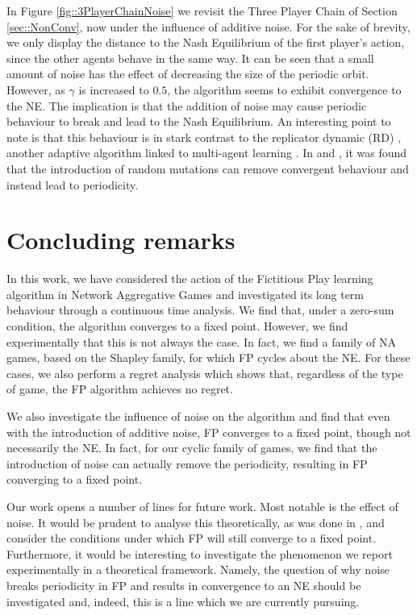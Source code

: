\documentclass{article}
\theoremstyle{definition}
\begin{document}
  In Figure \ref{fig::3PlayerChainNoise} we revisit the Three Player Chain of Section
  \ref{sec::NonConv}, now under the influence of additive noise. For the sake of brevity, we only
  display the distance to the Nash Equilibrium of the first player's action, since the other agents
  behave in the same way. It can be seen that a small amount of noise has the effect of decreasing
  the size of the periodic orbit. However, as $\gamma$
  is increased to $0.5$, the algorithm seems to exhibit convergence to the NE. The implication is
  that the addition of noise may cause periodic behaviour to break and lead to the Nash Equilibrium.
  An interesting point to note is that this behaviour is in stark contrast to the replicator
  dynamic (RD) \cite{Maynard-Smith}, another adaptive algorithm linked to multi-agent learning
  \cite{CyclesAdversarialLearning}. In \cite{Imhof} and \cite{Galla}, it was found that the
  introduction of random mutations can remove convergent behaviour and instead lead to periodicity. 
  
\section{Concluding remarks}
	In this work, we have considered the action of the Fictitious Play learning algorithm in Network Aggregative Games and investigated its long term behaviour through a continuous time analysis. We find that, under a zero-sum condition, the algorithm converges to a fixed point. However, we find experimentally that this is not always the case. In fact, we find a family of NA games, based on the Shapley family, for which FP cycles about the NE. For these cases, we also perform a regret analysis which shows that, regardless of the type of game, the FP algorithm achieves no regret. 
	
	We also investigate the influence of noise on the algorithm and find that even with the introduction of additive noise, FP converges to a fixed point, though not necessarily the NE. In fact, for our cyclic family of games, we find that the introduction of noise can actually remove the periodicity, resulting in FP converging to a fixed point.
	
	Our work opens a number of lines for future work. Most notable is the effect of noise. It would be prudent to analyse this theoretically, as was done in \cite{MFGFP}, and consider the conditions under which FP will still converge to a fixed point. Furthermore, it would be interesting to investigate the phenomenon we report experimentally in a theoretical framework. Namely, the question of why noise breaks periodicity in FP and results in convergence to an NE should be investigated and, indeed, this is a line which we are currently pursuing.
	
\end{document}
